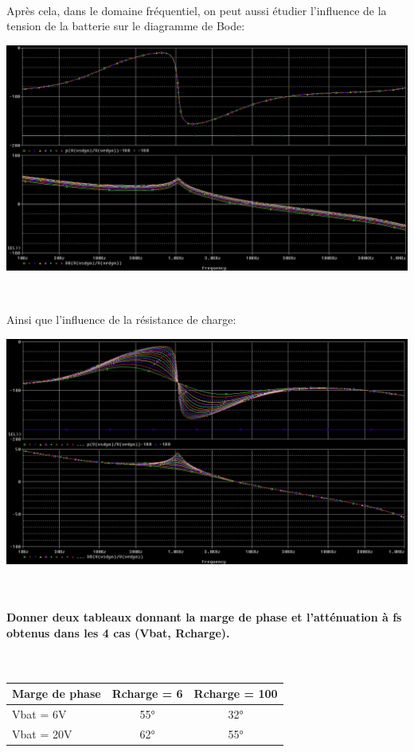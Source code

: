 \documentclass{article}
\begin{document}
~

Après cela, dans le domaine fréquentiel, on peut aussi étudier l’influence de la tension de la batterie sur le diagramme de Bode:

\includegraphics[width=\linewidth]{MP_param_Vbat.png}

~

Ainsi que l’influence de la résistance de charge:

\includegraphics[width=\linewidth]{MP_param_Rch.png}

~

\paragraph{Donner deux tableaux donnant la marge de phase et l’atténuation à fs obtenus dans les 4 cas (Vbat, Rcharge).}

~

\begin{tabular}{|l|c|c|}
    \hline
    Marge de phase & Rcharge = 6 & Rcharge = 100 \\
    \hline
    Vbat = 6V      & 55° & 32° \\
    \hline
    Vbat = 20V     & 62° & 55° \\
    \hline
\end{tabular}
\end{document}
